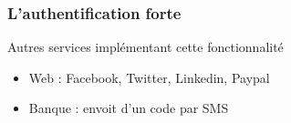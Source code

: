 \documentclass{beamer}
\begin{document}
\begin{frame}
\frametitle{L'authentification forte}
\begin{block}{Autres services implémentant cette fonctionnalité}
\begin{itemize}
\item Web : Facebook, Twitter, Linkedin, Paypal
\item Banque : envoit d'un code par SMS
\end{itemize}
\end{block}
\end{frame}



\end{document}
